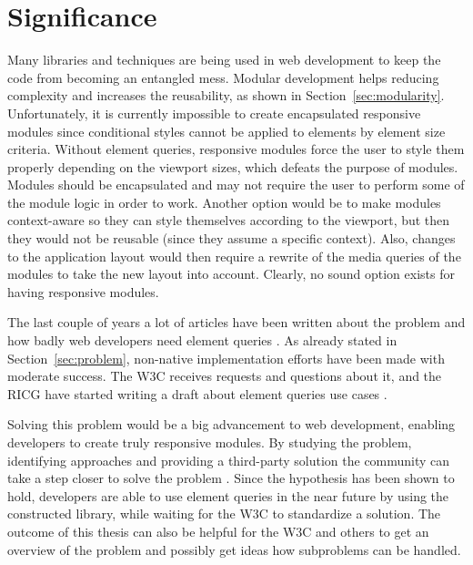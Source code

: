 \documentclass[a4paper,11pt]{kth-mag}
\begin{document}
    \section{Significance}
      Many libraries and techniques are being used in \gls{web} development to keep the code from becoming an entangled mess.
      Modular development helps reducing complexity and increases the reusability, as shown in Section~\ref{sec:modularity}.
      Unfortunately, it is currently impossible to create \gls{encapsulated} \gls{responsive} modules since conditional styles cannot be applied to \glspl{element} by \gls{element} size criteria.
      Without element queries, \gls{responsive} modules force the user to style them properly depending on the \gls{viewport} sizes, which defeats the purpose of modules.
      Modules should be \gls{encapsulated} and may not require the user to perform some of the module logic in order to work.
      Another option would be to make modules context-aware so they can style themselves according to the \gls{viewport}, but then they would not be reusable (since they assume a specific context).
      Also, changes to the application layout would then require a rewrite of the \gls{media queries} of the modules to take the new layout into account.
      Clearly, no sound option exists for having \gls{responsive} modules.

      The last couple of years a lot of articles have been written about the problem and how badly \gls{web} developers need element queries \cite{eq_article_localised-css,eq_article_backalley,eq_article_mqhack,eq_article_tabatkjr,eq_article_filament,eq_article_tyson,eq_article_neal,eq_article_css-tricks,eq_article_hugo,eq_article_fremycompany,eq_article_discource,eq_article_matt}.
      As already stated in Section~\ref{sec:problem}, non-\gls{native} implementation efforts have been made with moderate success.
      The \gls{W3C} receives requests and questions about it, and the \gls{RICG} have started writing a draft about element queries use cases \cite{ricg_draft}.

      Solving this problem would be a big advancement to \gls{web} development, enabling developers to create truly \gls{responsive} modules.
      By studying the problem, identifying approaches and providing a \gls{third-party} solution the community can take a step closer to solve the problem .
      Since the hypothesis has been shown to hold, developers are able to use element queries in the near future by using the constructed library, while waiting for the \gls{W3C} to standardize a solution.
      The outcome of this thesis can also be helpful for the \gls{W3C} and others to get an overview of the problem and possibly get ideas how subproblems can be handled.
\end{document}
